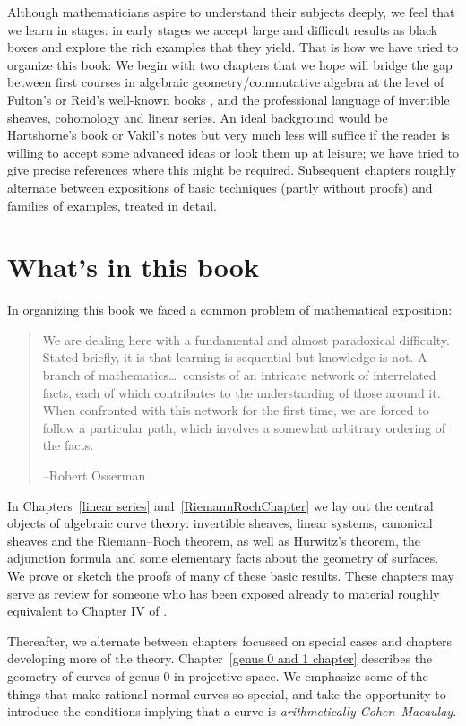 Although mathematicians aspire to understand their subjects deeply, we feel that we learn in stages: in early stages we accept large and difficult results as black boxes and explore the rich examples that they yield. That is how we have tried to organize this book: 
We begin with two chapters that we hope will bridge the gap between first courses in algebraic geometry/commutative algebra at the level of Fulton's or  Reid's well-known books \cite{Fulton1989}, \cite{MR982494} and the professional language of invertible sheaves, cohomology and linear series. An ideal background would
be Hartshorne's book \cite{Hartshorne1977} or Vakil's notes \cite{Vakil-notes} but very much less will suffice if the reader is willing to accept some advanced ideas or look them up at leisure; we have tried to give precise references where this might be required. Subsequent chapters roughly alternate between expositions of basic techniques (partly without proofs) and families of examples, treated in detail. 

\section*{What's in this book}
In organizing this book we faced a common problem of  mathematical exposition:
\begin{quote}
\small\sf
We are dealing here with a fundamental and almost paradoxical difficulty. Stated briefly, it is that learning is sequential but knowledge is not. A branch of mathematics\dots\ consists of an intricate network of interrelated facts, each of which contributes to the understanding of those around it. When confronted with this network for the first time, we are forced to follow a particular path, which involves a somewhat arbitrary ordering of the facts.

--Robert 
Osserman
\citeyear{Poetry}
%
\end{quote}

In Chapters~\ref{linear series} and~\ref{RiemannRochChapter} we lay out the central objects of algebraic curve theory: invertible sheaves, linear systems, canonical sheaves and the Riemann--Roch theorem, as well as
Hurwitz's theorem,
the adjunction formula and  some elementary facts about the geometry of surfaces. We prove or sketch the
proofs of many of these basic results. These chapters may serve as review for someone who has been exposed already to material roughly equivalent to Chapter IV of \cite{Hartshorne1977}. 

Thereafter, we alternate between chapters focussed on special cases and chapters developing more of the theory. Chapter~\ref{genus 0 and 1 chapter}  describes the geometry of curves of genus 0  in projective space. We emphasize some of the things that make rational normal curves so special, and take the opportunity to introduce the conditions implying that a curve is \emph{arithmetically Cohen--Macaulay}. 

